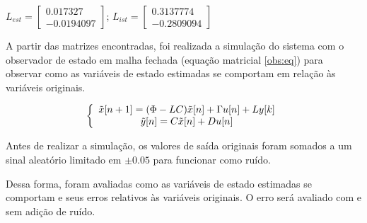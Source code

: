 \begin{center}
$L_{est} = \begin{bmatrix} 0.017327 \\ -0.0194097 \end{bmatrix}$; $L_{ist} = \begin{bmatrix} 0.3137774 \\ -0.2809094 \end{bmatrix}$
\end{center}

A partir das matrizes encontradas, foi realizada a simulação do sistema com o observador de estado em malha fechada (equação matricial \ref{obs:eq}) para observar como as variáveis de estado estimadas se comportam em relação às variáveis originais.

\begin{equation} \label{obs:eq}
\centering
\left \{
\begin{array}{cc}
\tilde{x}[n+1] = (\Phi-LC) \tilde{x}[n] + \Gamma u[n] + L y[k] \\
\tilde{y}[n] = C \tilde{x}[n] + D u[n]\\
\end{array}
\right.
\end{equation}

Antes de realizar a simulação, os valores de saída originais foram somados a um sinal aleatório limitado em $\pm 0.05$ para funcionar como ruído.

Dessa forma, foram avaliadas como as variáveis de estado estimadas se comportam e seus erros relativos às variáveis originais. O erro será avaliado com e sem adição de ruído. 


